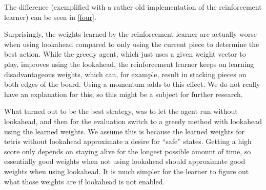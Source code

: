 \documentclass{ml}
\begin{document}
The difference (exemplified with a rather old implementation of the reinforcement learner) can be seen in \autoref{four}.

Surprisingly, the weights learned by the reinforcement learner are actually worse when using lookahead compared to only using the current piece to determine the best action.
While the greedy agent, which just uses a given weight vector to play, improves using the lookahead, the reinforcement learner keeps on learning disadvantageous weights, which can, for example, result in stacking pieces on both edges of the board. 
Using a momentum adds to this effect.
We do not really have an explanation for this, so this might be a subject for further research.

What turned out to be the best strategy, was to let the agent run without lookahead, and then for the evaluation switch to a greedy method with lookahead using the learned weights.
We assume this is because the learned weights for tetris without lookahead approximate a desire for ``safe'' states.
Getting a high score only depends on staying alive for the longest possible amount of time, so essentially good weights when not using lookahead should approximate good weights when using lookahead.
It is much simpler for the learner to figure out what those weights are if lookahead is not enabled.
\end{document}
